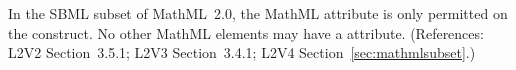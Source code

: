In the SBML subset of MathML~2.0, the MathML attribute
 is only permitted on the  construct.
No other MathML elements may have a  attribute.
(References: L2V2 Section~3.5.1; L2V3 Section~3.4.1; 
L2V4 Section~\ref{sec:mathmlsubset}.)
